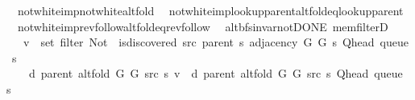 \begin{isabellebody}
\ \ not{\isacharunderscore}{\kern0pt}white{\isacharunderscore}{\kern0pt}imp{\isacharunderscore}{\kern0pt}not{\isacharunderscore}{\kern0pt}white{\isacharunderscore}{\kern0pt}alt{\isacharunderscore}{\kern0pt}fold\isanewline
\ \ not{\isacharunderscore}{\kern0pt}white{\isacharunderscore}{\kern0pt}imp{\isacharunderscore}{\kern0pt}lookup{\isacharunderscore}{\kern0pt}parent{\isacharunderscore}{\kern0pt}alt{\isacharunderscore}{\kern0pt}fold{\isacharunderscore}{\kern0pt}eq{\isacharunderscore}{\kern0pt}lookup{\isacharunderscore}{\kern0pt}parent\isanewline
\ \ not{\isacharunderscore}{\kern0pt}white{\isacharunderscore}{\kern0pt}imp{\isacharunderscore}{\kern0pt}rev{\isacharunderscore}{\kern0pt}follow{\isacharunderscore}{\kern0pt}alt{\isacharunderscore}{\kern0pt}fold{\isacharunderscore}{\kern0pt}eq{\isacharunderscore}{\kern0pt}rev{\isacharunderscore}{\kern0pt}follow\isanewline
\isanewline
{}\isamarkupfalse%
\ {\isacharparenleft}{\kern0pt}\ alt{\isacharunderscore}{\kern0pt}bfs{\isacharunderscore}{\kern0pt}invar{\isacharunderscore}{\kern0pt}not{\isacharunderscore}{\kern0pt}DONE{\isacharparenright}{\kern0pt}\ mem{\isacharunderscore}{\kern0pt}filterD{\isacharcolon}{\kern0pt}\isanewline
\ \ \ {\isachardoublequoteopen}v\ {\isasymin}\ set\ {\isacharparenleft}{\kern0pt}filter\ {\isacharparenleft}{\kern0pt}Not\ {\isasymcirc}\ is{\isacharunderscore}{\kern0pt}discovered\ src\ {\isacharparenleft}{\kern0pt}parent\ s{\isacharparenright}{\kern0pt}{\isacharparenright}{\kern0pt}\ {\isacharparenleft}{\kern0pt}adjacency\ G{}\ G{}\ s\ {\isacharparenleft}{\kern0pt}Q{\isacharunderscore}{\kern0pt}head\ {\isacharparenleft}{\kern0pt}queue\ s{\isacharparenright}{\kern0pt}{\isacharparenright}{\kern0pt}{\isacharparenright}{\kern0pt}{\isacharparenright}{\kern0pt}{\isachardoublequoteclose}\isanewline
\ \ \isanewline
\ \ \ \ {\isachardoublequoteopen}d\ {\isacharparenleft}{\kern0pt}parent\ {\isacharparenleft}{\kern0pt}alt{\isacharunderscore}{\kern0pt}fold\ G{}\ G{}\ src\ s{\isacharparenright}{\kern0pt}{\isacharparenright}{\kern0pt}\ v\ {\isacharequal}{\kern0pt}\ d\ {\isacharparenleft}{\kern0pt}parent\ {\isacharparenleft}{\kern0pt}alt{\isacharunderscore}{\kern0pt}fold\ G{}\ G{}\ src\ s{\isacharparenright}{\kern0pt}{\isacharparenright}{\kern0pt}\ {\isacharparenleft}{\kern0pt}Q{\isacharunderscore}{\kern0pt}head\ {\isacharparenleft}{\kern0pt}queue\ s{\isacharparenright}{\kern0pt}{\isacharparenright}{\kern0pt}\ {\isacharplus}{\kern0pt}\ {}{\isachardoublequoteclose}\isanewline

\end{isabellebody}
